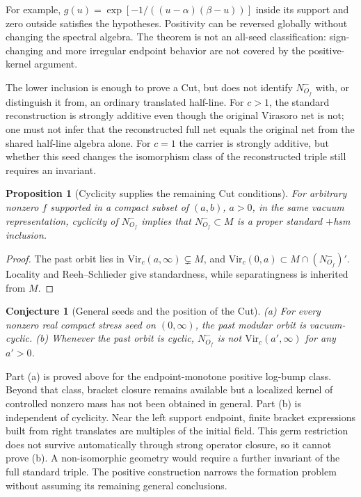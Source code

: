 \documentclass[12pt]{article}
\newtheorem{proposition}[theorem]{Proposition}
\newtheorem{conjecture}[theorem]{Conjecture}
\theoremstyle{definition}
\theoremstyle{remark}
\begin{document}
For example, \(g(u)=\exp[-1/((u-\alpha)(\beta-u))]\) inside its support and
zero outside satisfies the hypotheses. Positivity can be reversed globally
without changing the spectral algebra. The theorem is not an all-seed
classification: sign-changing and more irregular endpoint behavior are not
covered by the positive-kernel argument.

The lower inclusion is enough to prove a Cut, but does not identify
\(N^-_{O_f}\) with, or distinguish it from, an ordinary translated half-line.
For \(c>1\), the standard reconstruction is strongly additive even though the
original Virasoro net is not; one must not infer that the reconstructed full
net equals the original net from the shared half-line algebra alone.
For \(c=1\) the carrier is strongly additive, but whether this seed changes the
isomorphism class of the reconstructed triple still requires an invariant.

\begin{proposition}[Cyclicity supplies the remaining Cut conditions]\label{prop:standard}
For arbitrary nonzero \(f\) supported in a compact subset of \((a,b)\),
\(a>0\), in the same vacuum representation, cyclicity of \(N^-_{O_f}\)
implies that \(N^-_{O_f}\subset M\) is a proper standard \(+\)hsm inclusion.
\end{proposition}
\begin{proof}
The past orbit lies in \(\mathrm{Vir}_c(a,\infty)\subsetneq M\), and
\(\mathrm{Vir}_c(0,a)\subset M\cap(N^-_{O_f})'\). Locality and
Reeh--Schlieder give standardness, while separatingness is inherited from \(M\).
\end{proof}

\begin{conjecture}[General seeds and the position of the Cut]\label{conj:T1}
(a) For every nonzero real compact stress seed on \((0,\infty)\), the past
modular orbit is vacuum-cyclic.
(b) Whenever the past orbit is cyclic, \(N^-_{O_f}\) is not
\(\mathrm{Vir}_c(a',\infty)\) for any \(a'>0\).
\end{conjecture}
Part (a) is proved above for the endpoint-monotone positive log-bump class.
Beyond that class, bracket closure remains available but a localized kernel of
controlled nonzero mass has not been obtained in general.
Part (b) is independent of cyclicity. Near the left support endpoint, finite
bracket expressions built from right translates are multiples of the initial
field. This germ restriction does not survive automatically through strong
operator closure, so it cannot prove (b). A non-isomorphic geometry would
require a further invariant of the full standard triple.
The positive construction narrows the formation problem without assuming its
remaining general conclusions.
\end{document}
